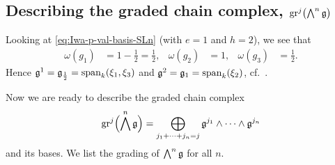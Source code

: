 \subsection{Describing the graded chain complex, \texorpdfstring{$\operatorname{gr}^{j}\bigl(\bigwedge^{n}\mathfrak{g}\bigr)$}{grj(wedge-n g)}}%
\label{subsec:graded-complex-SL2}

Looking at \eqref{eq:Iwa-p-val-basis-SLn} (with $e=1$ and $h=2$), we see that
\begin{align*}
  \omega(g_{1}) &= 1-\frac{1}{2} = \frac{1}{2}, & \omega(g_{2}) &= 1, & \omega(g_{3}) &= \frac{1}{2}.
\end{align*}
Hence $\mathfrak{g}^{1} = \mathfrak{g}_{\frac{1}{2}} = \operatorname{span}_{k}(\xi_{1},\xi_{3})$ and $\mathfrak{g}^{2} = \mathfrak{g}_{1} = \operatorname{span}_{k}(\xi_{2})$, cf.\ .


Now we are ready to describe the graded chain complex
\begin{equation*}
  \operatorname{gr}^{j}\Bigl( \bigwedge^{n}\mathfrak{g} \Bigr) = \bigoplus_{j_{1} + \dotsb + j_{n} = j} \mathfrak{g}^{j_{1}} \wedge \dotsb \wedge \mathfrak{g}^{j_{n}}
\end{equation*}
and its bases. We list the grading of $\bigwedge^{n}\mathfrak{g}$ for all $n$.

